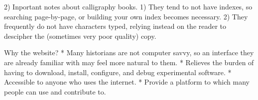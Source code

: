 2) Inportant notes about calligraphy books.  1)  They tend to not have indexes, so searching page-by-page, or building your own index becomes necessary.  2)  They frequently do not have characters typed, relying instead on the reader to descipher the (sometimes very poor quality) copy.

    
Why the website?
    * Many historians are not computer savvy, so an interface they are already familiar with may feel more natural to them.
    * Relieves the burden of having to download, install, configure, and debug experimental software.
    * Accessible to anyone who uses the internet.
    * Provide  a platform to which many people can use and contribute to.

